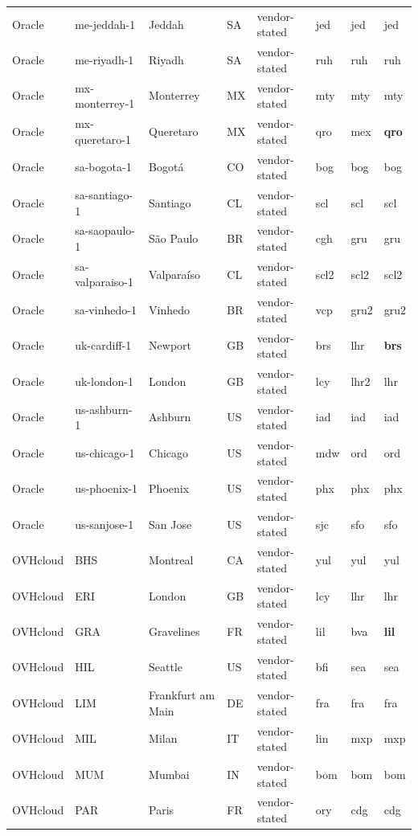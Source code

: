 \begin{longtable}{llllllll}
Oracle & me-jeddah-1 & Jeddah & SA & vendor-stated & jed & jed & jed \\
Oracle & me-riyadh-1 & Riyadh & SA & vendor-stated & ruh & ruh & ruh \\
Oracle & mx-monterrey-1 & Monterrey & MX & vendor-stated & mty & mty & mty \\
Oracle & mx-queretaro-1 & Queretaro & MX & vendor-stated & qro & mex & \textbf{qro} \\
Oracle & sa-bogota-1 & Bogotá & CO & vendor-stated & bog & bog & bog \\
Oracle & sa-santiago-1 & Santiago & CL & vendor-stated & scl & scl & scl \\
Oracle & sa-saopaulo-1 & São Paulo & BR & vendor-stated & cgh & gru & gru \\
Oracle & sa-valparaiso-1 & Valparaíso & CL & vendor-stated & scl2 & scl2 & scl2 \\
Oracle & sa-vinhedo-1 & Vinhedo & BR & vendor-stated & vcp & gru2 & gru2 \\
Oracle & uk-cardiff-1 & Newport & GB & vendor-stated & brs & lhr & \textbf{brs} \\
Oracle & uk-london-1 & London & GB & vendor-stated & lcy & lhr2 & lhr \\
Oracle & us-ashburn-1 & Ashburn & US & vendor-stated & iad & iad & iad \\
Oracle & us-chicago-1 & Chicago & US & vendor-stated & mdw & ord & ord \\
Oracle & us-phoenix-1 & Phoenix & US & vendor-stated & phx & phx & phx \\
Oracle & us-sanjose-1 & San Jose & US & vendor-stated & sjc & sfo & sfo \\
OVHcloud & BHS & Montreal & CA & vendor-stated & yul & yul & yul \\
OVHcloud & ERI & London & GB & vendor-stated & lcy & lhr & lhr \\
OVHcloud & GRA & Gravelines & FR & vendor-stated & lil & bva & \textbf{lil} \\
OVHcloud & HIL & Seattle & US & vendor-stated & bfi & sea & sea \\
OVHcloud & LIM & Frankfurt am Main & DE & vendor-stated & fra & fra & fra \\
OVHcloud & MIL & Milan & IT & vendor-stated & lin & mxp & mxp \\
OVHcloud & MUM & Mumbai & IN & vendor-stated & bom & bom & bom \\
OVHcloud & PAR & Paris & FR & vendor-stated & ory & cdg & cdg \\

\end{longtable}
